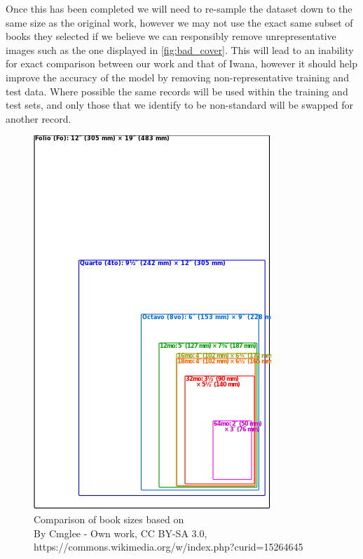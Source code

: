 \documentclass[12pt]{article}
\numberwithin{equation}{section}
\numberwithin{figure}{section}
\begin{document}
Once this has been completed we will need to re-sample the dataset down to the same size as the original work, however we may not use the exact same subset of books they selected if we believe we can responsibly remove unrepresentative images such as the one displayed in \cref{fig:bad_cover}. This will lead to an inability for exact comparison between our work and that of Iwana, however it should help improve the accuracy of the model by removing non-representative training and test data. Where possible the same records will be used within the training and test sets, and only those that we identify to be non-standard will be swapped for another record.
\begin{figure}
	\centering
	\captionsetup{justification=centering,margin=2cm}
	\includegraphics[scale=0.5]{Comparison_book_sizes}
	\caption{Comparison of book sizes based on \cite{AmericanLibraryAssociation.CommitteeonLibraryTerminology.1971}\\
		\footnotesize{By Cmglee - Own work, CC BY-SA 3.0, https://commons.wikimedia.org/w/index.php?curid=15264645}}
	\label{fig:book_cover_sizes}
\end{figure}
\end{document}

